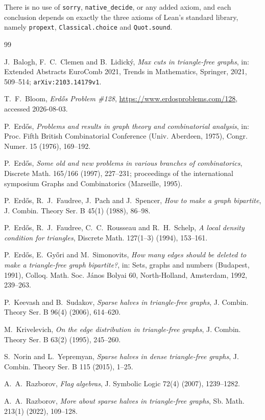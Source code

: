 \documentclass[11pt,reqno]{amsart}
\theoremstyle{plain}
\begin{document}
There is no use of \texttt{sorry}, \texttt{native\_decide}, or any added
axiom, and each conclusion depends on
exactly the three axioms of Lean's standard library, namely \texttt{propext},
\texttt{Classical.choice} and \texttt{Quot.sound}.

\begin{thebibliography}{99}

J.~Balogh, F.~C.~Clemen and B.~Lidick\'y,
\emph{Max cuts in triangle-free graphs},
in: Extended Abstracts EuroComb 2021, Trends in Mathematics, Springer, 2021,
509--514; \texttt{arXiv:2103.14179v1}.

T.~F.~Bloom,
\emph{Erd\H{o}s Problem \#128},
\url{https://www.erdosproblems.com/128}, accessed 2026-08-03.

P.~Erd\H{o}s,
\emph{Problems and results in graph theory and combinatorial analysis},
in: Proc. Fifth British Combinatorial Conference (Univ. Aberdeen, 1975),
Congr. Numer. 15 (1976), 169--192.

P.~Erd\H{o}s,
\emph{Some old and new problems in various branches of combinatorics},
Discrete Math. 165/166 (1997), 227--231; proceedings of the international
symposium Graphs and Combinatorics (Marseille, 1995).

P.~Erd\H{o}s, R.~J.~Faudree, J.~Pach and J.~Spencer,
\emph{How to make a graph bipartite},
J. Combin. Theory Ser. B 45(1) (1988), 86--98.

P.~Erd\H{o}s, R.~J.~Faudree, C.~C.~Rousseau and R.~H.~Schelp,
\emph{A local density condition for triangles},
Discrete Math. 127(1--3) (1994), 153--161.

P.~Erd\H{o}s, E.~Gy\H{o}ri and M.~Simonovits,
\emph{How many edges should be deleted to make a triangle-free graph
bipartite?},
in: Sets, graphs and numbers (Budapest, 1991), Colloq. Math. Soc. J\'anos
Bolyai 60, North-Holland, Amsterdam, 1992, 239--263.

P.~Keevash and B.~Sudakov,
\emph{Sparse halves in triangle-free graphs},
J. Combin. Theory Ser. B 96(4) (2006), 614--620.

M.~Krivelevich,
\emph{On the edge distribution in triangle-free graphs},
J. Combin. Theory Ser. B 63(2) (1995), 245--260.

S.~Norin and L.~Yepremyan,
\emph{Sparse halves in dense triangle-free graphs},
J. Combin. Theory Ser. B 115 (2015), 1--25.

A.~A.~Razborov,
\emph{Flag algebras},
J. Symbolic Logic 72(4) (2007), 1239--1282.

A.~A.~Razborov,
\emph{More about sparse halves in triangle-free graphs},
Sb. Math. 213(1) (2022), 109--128.

\end{thebibliography}
\end{document}
